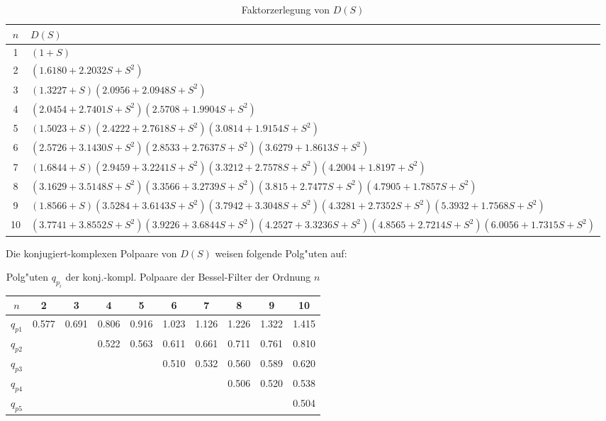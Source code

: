 \begin{table}[!htb] %
\vspace*{-3mm}\begin{center}
{\footnotesize
\begin{tabular}{|c||l|}\hline
$n$ & $D(S)$ {}\\ \hline\hline
 1 & $(1+S)$     \\ \hline
 2 & $(1.6180+2.2032S+S^2)$ \\ \hline
 3 & $(1.3227+S)(2.0956+2.0948S+S^2)$  \\ \hline
 4 & $(2.0454+2.7401S+S^2)(2.5708+1.9904S+S^2)$ \\ \hline
 5 & $(1.5023+S)(2.4222+2.7618S+S^2)(3.0814+1.9154S+S^2)$    \\ \hline
 6 & $(2.5726+3.1430S+S^2)(2.8533+2.7637S+S^2)(3.6279+1.8613S+S^2)$  \\ \hline   
 7 & $(1.6844+S)(2.9459+3.2241S+S^2)(3.3212+2.7578S+S^2)(4.2004+1.8197+S^2)$   \\ \hline   
 8 & $(3.1629+3.5148S+S^2)(3.3566+3.2739S+S^2)(3.815+2.7477S+S^2)(4.7905+1.7857S+S^2)$  \\ \hline
 9 & {\scriptsize $(1.8566+S)(3.5284+3.6143S+S^2)(3.7942+3.3048S+S^2)(4.3281+2.7352S+S^2)(5.3932+1.7568S+S^2)$} \\ \hline
10 & {\tiny $(3.7741+3.8552S+S^2)(3.9226+3.6844S+S^2)(4.2527+3.3236S+S^2)(4.8565+2.7214S+S^2)(6.0056+1.7315S+S^2)$} \\ \hline
\end{tabular}\vspace*{-2mm}\caption{Faktorzerlegung von $D(S)$ } \label{fak-b}
}
\end{center}
\vspace*{-6mm}
\end{table}


Die konjugiert-komplexen Polpaare von $D(S)$ weisen folgende Polg"uten auf:
\begin{table}[!htb]
\begin{center}
\begin{tabular}{|c||c|c|c|c|c|c|c|c|c|}\hline
$n$ & 2 & 3 & 4 & 5 & 6 & 7 & 8 & 9 & 10\\ \hline\hline
$q_{p1}$      & 0.577 & 0.691 & 0.806 & 0.916 & 1.023 & 1.126 & 1.226 & 1.322 & 1.415 \\ \hline
$q_{p2}$      &       &       & 0.522 & 0.563 & 0.611 & 0.661 & 0.711 & 0.761 & 0.810 \\ \hline
$q_{p3}$      &       &       &       &       & 0.510 & 0.532 & 0.560 & 0.589 & 0.620 \\ \hline
$q_{p4}$      &       &       &       &       &       &       & 0.506 & 0.520 & 0.538 \\ \hline
$q_{p5}$      &       &       &       &       &       &       &       &       & 0.504 \\ \hline
\end{tabular}
\end{center}
\vspace*{-5mm}\caption{Polg"uten $q_{p_i}$ der konj.-kompl. Polpaare der Bessel-Filter der Ordnung $n$ \label{pg-b}}
\end{table}\vspace*{-5mm}

